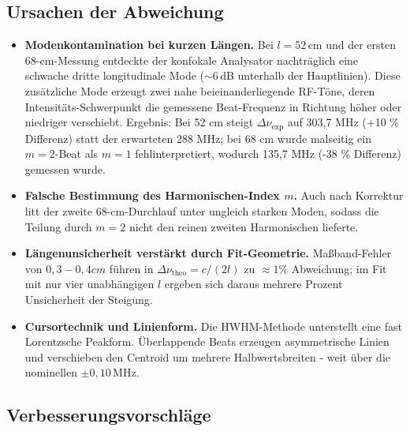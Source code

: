 \subsection*{Ursachen der Abweichung}

\begin{itemize}
  \item \textbf{Modenkontamination bei kurzen Längen.}  
    Bei \(l=52\,\mathrm{cm}\) und der ersten 68-cm-Messung entdeckte der konfokale Analysator nachträglich eine schwache dritte longitudinale Mode (\(\sim\!6\)\,dB unterhalb der Hauptlinien). Diese zusätzliche Mode erzeugt zwei nahe beieinanderliegende RF-Töne, deren Intensitäts-Schwerpunkt die gemessene Beat-Frequenz in Richtung höher oder niedriger verschiebt. Ergebnis: Bei 52 cm steigt \(\Delta\nu_{\mathrm{exp}}\) auf 303,7 MHz (+10 \% Differenz) statt der erwarteten 288 MHz; bei 68 cm wurde malseitig ein \(m=2\)-Beat als \(m=1\) fehlinterpretiert, wodurch 135,7 MHz (-38 \% Differenz) gemessen wurde.

  \item \textbf{Falsche Bestimmung des Harmonischen-Index \(m\).}  
    Auch nach Korrektur litt der zweite 68-cm-Durchlauf unter ungleich starken Moden, sodass die Teilung durch \(m=2\) nicht den reinen zweiten Harmonischen lieferte.

  \item \textbf{Längenunsicherheit verstärkt durch Fit-Geometrie.}  
    Maßband-Fehler von $0{,}3-0{,}4 cm$ führen in $\Delta\nu_{\mathrm{theo}}=c/(2l)$ zu $\approx 1 \%$ Abweichung; im Fit mit nur vier unabhängigen $l$ ergeben sich daraus mehrere Prozent Unsicherheit der Steigung.

  \item \textbf{Cursortechnik und Linienform.}  
    Die HWHM-Methode unterstellt eine fast Lorentzsche Peakform. Überlappende Beats erzeugen asymmetrische Linien und verschieben den Centroid um mehrere Halbwertsbreiten - weit über die nominellen \(\pm0{,}10\)\,MHz.
\end{itemize}

\subsection*{Verbesserungsvorschläge}

